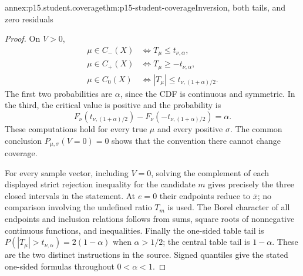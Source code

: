\begin{annexitem}{annex:p15.student.coverage}{thm:p15-student-coverage}{Inversion, both tails, and zero residuals}
\begin{proof}
On \(V>0\),
\[
\begin{aligned}
 \mu\in C_-(X)&\iff T_\mu\leq t_{\nu,\alpha},\\
 \mu\in C_+(X)&\iff T_\mu\geq-t_{\nu,\alpha},\\
 \mu\in C_0(X)&\iff
            |T_\mu|\leq t_{\nu,(1+\alpha)/2}.
\end{aligned}
\]
The first two probabilities are \(\alpha\), since
the CDF is continuous and symmetric. In the third,
the critical value is positive and the probability is
\[
 F_\nu(t_{\nu,(1+\alpha)/2})
       -F_\nu(-t_{\nu,(1+\alpha)/2})
                       =\alpha.
\]
These computations hold for every true \(\mu\) and
every positive \(\sigma\). The common conclusion
\(P_{\mu,\sigma}(V=0)=0\) shows that the convention
there cannot change coverage.

For every sample vector, including \(V=0\), solving
the complement of each displayed strict rejection
inequality for the candidate \(m\) gives precisely
the three closed intervals in the statement.
At \(e=0\) their endpoints reduce to \(\bar x\);
no comparison involving the undefined ratio \(T_m\)
is used. The Borel character of all endpoints and
inclusion relations follows from sums, square roots
of nonnegative continuous functions, and inequalities.
Finally the one-sided table tail is
\(P(|T_\mu|>t_{\nu,\alpha})=2(1-\alpha)\) when
\(\alpha>1/2\); the central table tail is
\(1-\alpha\). These are the two distinct instructions
in the source. Signed quantiles give the stated
one-sided formulas throughout \(0<\alpha<1\).
\end{proof}
\end{annexitem}


